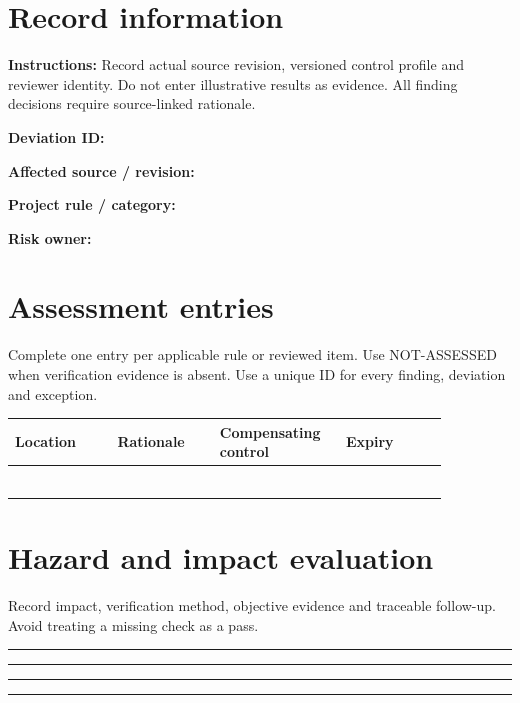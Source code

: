 \documentclass[10pt,letterpaper]{article}
\begin{document}
\makedoctitle
\makedocsummary
\section{Record information}
\textbf{Instructions:} Record actual source revision, versioned control profile and reviewer identity. Do not enter illustrative results as evidence. All finding decisions require source-linked rationale.\par\medskip
\noindent\textbf{Deviation ID:}\quad\hrulefill\par\vspace{11pt}
\noindent\textbf{Affected source / revision:}\quad\hrulefill\par\vspace{11pt}
\noindent\textbf{Project rule / category:}\quad\hrulefill\par\vspace{11pt}
\noindent\textbf{Risk owner:}\quad\hrulefill\par\vspace{11pt}
\section{Assessment entries}
Complete one entry per applicable rule or reviewed item. Use NOT-ASSESSED when verification evidence is absent. Use a unique ID for every finding, deviation and exception.\par\medskip
\begin{longtable}{|p{0.215\linewidth}|p{0.215\linewidth}|p{0.215\linewidth}|p{0.215\linewidth}|}
\hline
\textbf{Location} & \textbf{Rationale} & \textbf{Compensating control} & \textbf{Expiry}\\\hline
\endhead
\rule{0pt}{27pt} & & & \\\hline
\rule{0pt}{27pt} & & & \\\hline
\rule{0pt}{27pt} & & & \\\hline
\rule{0pt}{27pt} & & & \\\hline
\rule{0pt}{27pt} & & & \\\hline
\rule{0pt}{27pt} & & & \\\hline
\end{longtable}
\section{Hazard and impact evaluation}
Record impact, verification method, objective evidence and traceable follow-up. Avoid treating a missing check as a pass.\par\medskip
\noindent\rule{\linewidth}{0.4pt}\par\vspace{16pt}
\noindent\rule{\linewidth}{0.4pt}\par\vspace{16pt}
\noindent\rule{\linewidth}{0.4pt}\par\vspace{16pt}
\noindent\rule{\linewidth}{0.4pt}\par\vspace{16pt}
\end{document}
